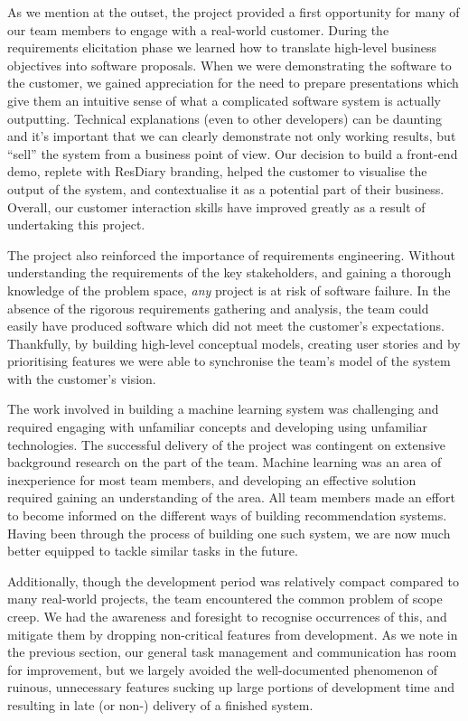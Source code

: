 \documentclass{l3proj}
\begin{document}
As we mention at the outset, the project provided a first opportunity for many of our team members to engage with a real-world customer. During the requirements elicitation phase we learned how to translate high-level business objectives into software proposals. When we were demonstrating the software to the customer, we gained appreciation for the need to prepare presentations which give them an intuitive sense of what a complicated software system is actually outputting. Technical explanations (even to other developers) can be daunting and it’s important that we can clearly demonstrate not only working results, but “sell” the system from a business point of view. Our decision to build a front-end demo, replete with ResDiary branding, helped the customer to visualise the output of the system, and contextualise it as a potential part of their business. Overall, our customer interaction skills have improved greatly as a result of undertaking this project.

The project also reinforced the importance of requirements engineering. Without understanding the requirements of the key stakeholders, and gaining a thorough knowledge of the problem space, \textit{any} project is at risk of software failure. In the absence of the rigorous requirements gathering and analysis, the team could easily have produced software which did not meet the customer’s expectations. Thankfully, by building high-level conceptual models, creating user stories and by prioritising features we were able to synchronise the team’s model of the system with the customer’s vision. 

The work involved in building a machine learning system was challenging and required engaging with unfamiliar concepts and developing using unfamiliar technologies. The successful delivery of the project was contingent on extensive background research on the part of the team. Machine learning was an area of inexperience for most team members, and developing an effective solution required gaining an understanding of the area. All team members made an effort to become informed on the different ways of building recommendation systems. Having been through the process of building one such system, we are now much better equipped to tackle similar tasks in the future. 

Additionally, though the development period was relatively compact compared to many real-world projects, the team encountered the common problem of scope creep. We had the awareness and foresight to recognise occurrences of this, and mitigate them by dropping non-critical features from development. As we note in the previous section, our general task management and communication has room for improvement, but we largely avoided the well-documented phenomenon of ruinous, unnecessary features sucking up large portions of development time and resulting in late (or non-) delivery of a finished system.
\end{document}
